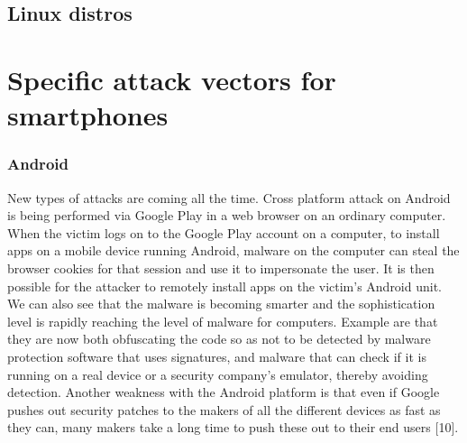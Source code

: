 \subsection{Linux distros}
\section{Specific attack vectors for smartphones}
\subsubsection{Android}
New types of attacks are coming all the time. Cross platform attack on Android is being performed via Google Play in a web browser on an ordinary computer. When the victim logs on to the Google Play account on a computer, to install apps on a mobile device running Android, malware on the computer can steal the browser cookies for that session and use it to impersonate the user. It is then possible for the attacker to remotely install apps on the victim’s Android unit. We can also see that the malware is becoming smarter and the sophistication level is rapidly reaching the level of malware for computers. Example are that they are now both obfuscating the code so as not to be detected by malware protection software that uses signatures, and malware that can check if it is running on a real device or a security company’s emulator, thereby avoiding detection. Another weakness with the Android platform is that even if Google pushes out security patches to the makers of all the different devices as fast as they can, many makers take a long time to push these out to their end users [10].
